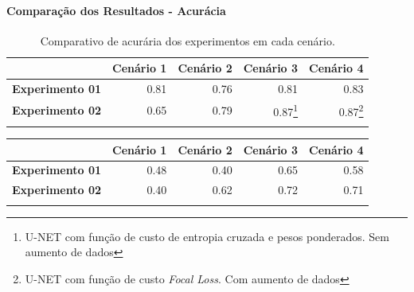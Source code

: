 \documentclass[%
  10pt,%
  aspectratio = 169,%
  compress,%
  t,%
  english,%
  brazilian,%
  tikz,
]{beamer}
\begin{document}
\begin{frame}
\framesubtitle{Comparação dos Resultados - Acurácia}

\begin{table}[!ht]
    \centering
    \caption{Comparativo de acurária dos experimentos em cada cenário.}%
    \label{tab:res:acuracia}%
    \begin{tabular}{lrrrr}
    \toprule
        \textbf{} & \textbf{Cenário 1} & \textbf{Cenário 2} & \textbf{Cenário 3} & \textbf{Cenário 4} \\
        \midrule
        \textbf{Experimento 01}  & 0.81 & 0.76 & 0.81 & 0.83 \\ 
        \textbf{Experimento 02}  & 0.65 & 0.79 & \colorbox{green!25}{0.87}\footnote{U-NET com função de custo de entropia cruzada e pesos ponderados. Sem aumento de dados} & \colorbox{green!25}{0.87}\footnote{U-NET com função de custo \textit{Focal Loss}. Com aumento de dados} \\
        \bottomrule
        \addlinespace
    \end{tabular}
\end{table}

\textcolor{gray!25}{
\begin{table}[!ht]
    \centering
    \begin{tabular}{lrrrr}
    \toprule
        \textbf{} & \textbf{Cenário 1} & \textbf{Cenário 2} & \textbf{Cenário 3} & \textbf{Cenário 4} \\
        \midrule
        \textbf{Experimento 01}  & 0.48 & 0.40 & 0.65 & 0.58 \\ 
        \textbf{Experimento 02}  & 0.40 & 0.62 & \colorbox{green!25}{0.72} & \colorbox{green!25}{0.71} \\
        \bottomrule
        \addlinespace
    \end{tabular}
\end{table}}

\end{frame}
\end{document}
